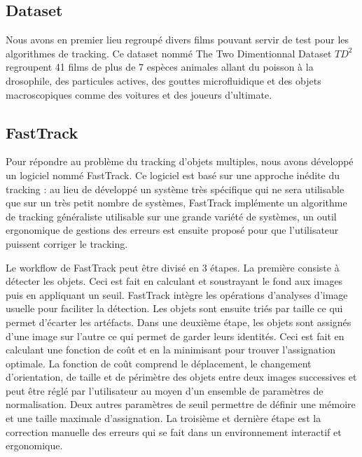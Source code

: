 \subsection*{Dataset}
Nous avons en premier lieu regroupé divers films pouvant servir de test pour les algorithmes de tracking. Ce dataset nommé The Two Dimentionnal Dataset $TD^2$ regroupent 41 films de plus de 7 espèces animales allant du poisson à la drosophile, des particules actives, des gouttes microfluidique et des objets macroscopiques comme des voitures et des joueurs d'ultimate.

\subsection*{FastTrack}
Pour répondre au problème du tracking d'objets multiples, nous avons développé un logiciel nommé FastTrack. Ce logiciel est basé sur une approche inédite du tracking : au lieu de développé un système très spécifique qui ne sera utilisable que sur un très petit nombre de systèmes, FastTrack implémente un algorithme de tracking généraliste utilisable sur une grande variété de systèmes, un outil ergonomique de gestions des erreurs est ensuite proposé pour que l'utilisateur puissent corriger le tracking.

Le workflow de FastTrack peut être divisé en 3 étapes. La première consiste à détecter les objets. Ceci est fait en calculant et soustrayant le fond aux images puis en appliquant un seuil. FastTrack intègre les opérations d'analyses d'image usuelle pour faciliter la détection. Les objets sont ensuite triés par taille ce qui permet d'écarter les artéfacts. Dans une deuxième étape, les objets sont assignés d'une image sur l'autre ce qui permet de garder leurs identités. Ceci est fait en calculant une fonction de coût et en la minimisant pour trouver l'assignation optimale. La fonction de coût comprend le déplacement, le changement d'orientation, de taille et de périmètre des objets entre deux images successives et peut être réglé par l'utilisateur au moyen d'un ensemble de paramètres de normalisation. Deux autres paramètres de seuil permettre de définir une mémoire et une taille maximale d'assignation. La troisième et dernière étape est la correction manuelle des erreurs qui se fait dans un environnement interactif et ergonomique.

